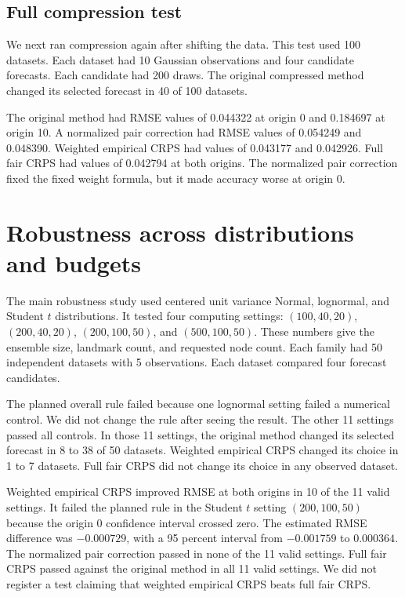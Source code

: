 \documentclass[11pt]{article}
\begin{document}
\subsection{Full compression test}

We next ran compression again after shifting the data. This test used 100 datasets. Each dataset had 10 Gaussian observations and four candidate forecasts. Each candidate had 200 draws. The original compressed method changed its selected forecast in 40 of 100 datasets.

The original method had RMSE values of 0.044322 at origin 0 and 0.184697 at origin 10. A normalized pair correction had RMSE values of 0.054249 and 0.048390. Weighted empirical CRPS had values of 0.043177 and 0.042926. Full fair CRPS had values of 0.042794 at both origins. The normalized pair correction fixed the fixed weight formula, but it made accuracy worse at origin 0.

\section{Robustness across distributions and budgets}

The main robustness study used centered unit variance Normal, lognormal, and Student $t$ distributions. It tested four computing settings: $(100,40,20)$, $(200,40,20)$, $(200,100,50)$, and $(500,100,50)$. These numbers give the ensemble size, landmark count, and requested node count. Each family had 50 independent datasets with 5 observations. Each dataset compared four forecast candidates.

The planned overall rule failed because one lognormal setting failed a numerical control. We did not change the rule after seeing the result. The other 11 settings passed all controls. In those 11 settings, the original method changed its selected forecast in 8 to 38 of 50 datasets. Weighted empirical CRPS changed its choice in 1 to 7 datasets. Full fair CRPS did not change its choice in any observed dataset.

Weighted empirical CRPS improved RMSE at both origins in 10 of the 11 valid settings. It failed the planned rule in the Student $t$ setting $(200,100,50)$ because the origin 0 confidence interval crossed zero. The estimated RMSE difference was $-0.000729$, with a 95 percent interval from $-0.001759$ to $0.000364$. The normalized pair correction passed in none of the 11 valid settings. Full fair CRPS passed against the original method in all 11 valid settings. We did not register a test claiming that weighted empirical CRPS beats full fair CRPS.
\end{document}

